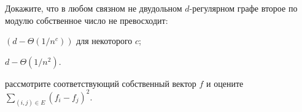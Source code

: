 Докажите, что в любом связном не двудольном $d$-регулярном графе второе по модулю собственное число не
превосходит:
\begin{enumcyr}
    \item $\left( d - \Theta\left(1 / n^c\right)\right)$ для некоторого $c$;
    \item $d - \Theta(1 / n^2)$.
\end{enumcyr}

 рассмотрите соответствующий собственный вектор $f$ и оцените
$\sum\limits_{(i, j) \in E} (f_i - f_j)^2$. 